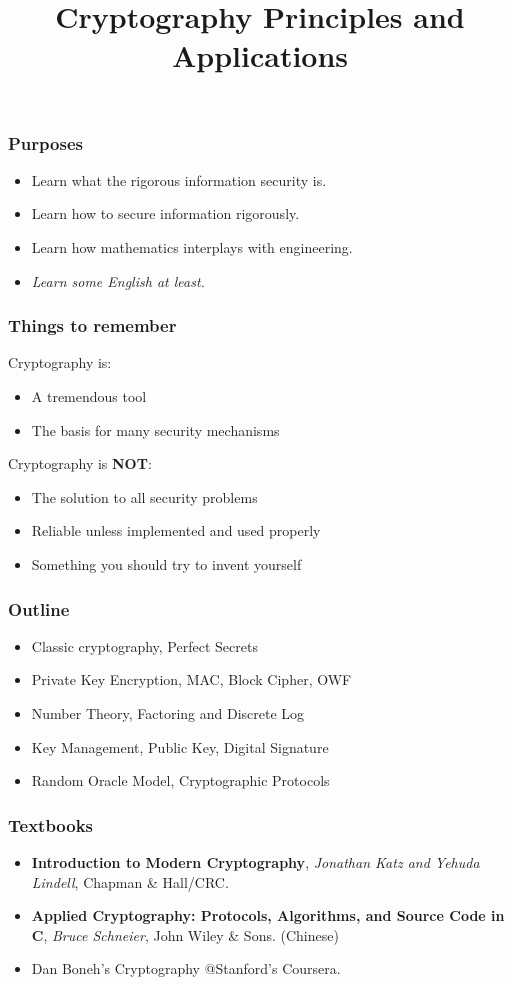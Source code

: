 

\title{Cryptography Principles and Applications}


\maketitle
\begin{frame}\frametitle{Purposes}
\begin{itemize}
\item Learn what the rigorous information security is.
\item Learn how to secure information rigorously.
\item Learn how mathematics interplays with engineering.
\item \emph{Learn some English at least.}
\end{itemize}
\end{frame}
\begin{frame}\frametitle{Things to remember}
Cryptography is:
\begin{itemize}
\item A tremendous tool
\item The basis for many security mechanisms
\end{itemize}
Cryptography is \textbf{NOT}:
\begin{itemize}
\item The solution to all security problems
\item Reliable unless implemented and used properly
\item Something you should try to invent yourself	
\end{itemize}
\end{frame}
\begin{frame}\frametitle{Outline}
\begin{itemize}
\item Classic cryptography, Perfect Secrets
\item Private Key Encryption, MAC, Block Cipher, OWF
\item Number Theory, Factoring and Discrete Log
\item Key Management, Public Key, Digital Signature
\item Random Oracle Model, Cryptographic Protocols
\end{itemize}	
\end{frame}
\begin{frame}\frametitle{Textbooks}
\begin{itemize}
\item \textbf{Introduction to Modern Cryptography}, \emph{Jonathan Katz and Yehuda Lindell}, Chapman \& Hall/CRC.
\item \textbf{Applied Cryptography: Protocols, Algorithms, and Source Code in C}, \emph{Bruce Schneier}, John Wiley \& Sons. (Chinese)
\item Dan Boneh's Cryptography @Stanford's Coursera.
\end{itemize}
\end{frame}
